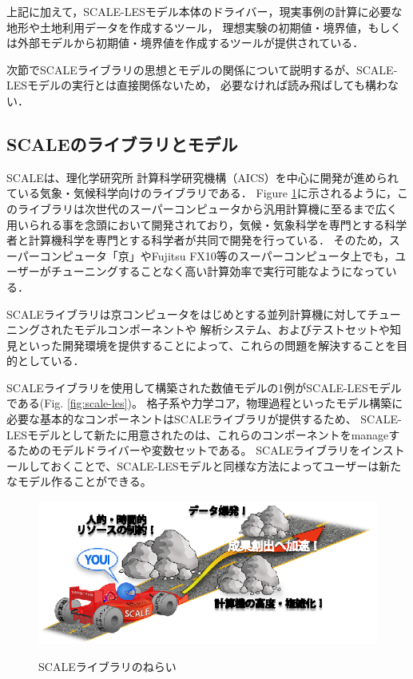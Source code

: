 上記に加えて，SCALE-LESモデル本体のドライバー，現実事例の計算に必要な地形や土地利用データを作成するツール，
理想実験の初期値・境界値，もしくは外部モデルから初期値・境界値を作成するツールが提供されている．

次節でSCALEライブラリの思想とモデルの関係について説明するが、SCALE-LESモデルの実行とは直接関係ないため，
必要なければ読み飛ばしても構わない．


\subsection{SCALEのライブラリとモデル}
SCALEは、理化学研究所 計算科学研究機構（AICS）を中心に開発が進められている気象・気候科学向けのライブラリである．
Figure \ref{fig:scale}に示されるように，このライブラリは次世代のスーパーコンピュータから汎用計算機に至るまで広く
用いられる事を念頭において開発されており，気候・気象科学を専門とする科学者と計算機科学を専門とする科学者が共同で開発を行っている．
そのため，スーパーコンピュータ「京」やFujitsu FX10等のスーパーコンピュータ上でも，ユーザーがチューニングすることなく高い計算効率で実行可能なようになっている．

SCALEライブラリは京コンピュータをはじめとする並列計算機に対してチューニングされたモデルコンポーネントや
解析システム、およびテストセットや知見といった開発環境を提供することによって、これらの問題を解決することを目的としている．

SCALEライブラリを使用して構築された数値モデルの1例がSCALE-LESモデルである(Fig. \ref{fig:scale-les})。
格子系や力学コア，物理過程といったモデル構築に必要な基本的なコンポーネントはSCALEライブラリが提供するため、
SCALE-LESモデルとして新たに用意されたのは、これらのコンポーネントをmanageするためのモデルドライバーや変数セットである。
SCALEライブラリをインストールしておくことで、SCALE-LESモデルと同様な方法によってユーザーは新たなモデル作ることができる。

\begin{figure}[t]
\begin{center}
  \includegraphics[width=0.9\hsize]{./figure/library.eps}\\
  \caption{SCALEライブラリのねらい}
  \label{fig:scale}
\end{center}
\end{figure}

